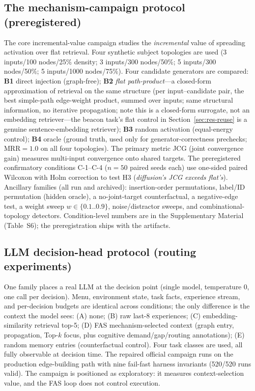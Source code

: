 \documentclass[10pt,a4paper]{article}
\begin{document}
\subsection{The mechanism-campaign protocol (preregistered)}
\label{sec:method-civ}
The core incremental-value campaign studies the \emph{incremental} value of spreading activation over flat retrieval. Four synthetic subject topologies are used (3 inputs/100 nodes/25\% density; 3 inputs/300 nodes/50\%; 5 inputs/300 nodes/50\%; 5 inputs/1000 nodes/75\%). Four candidate generators are compared: \textbf{B1} direct injection (graph-free); \textbf{B2} \emph{flat path-product}---a closed-form approximation of retrieval on the same structure (per input--candidate pair, the best simple-path edge-weight product, summed over inputs; same structural information, no iterative propagation; note this is a closed-form surrogate, not an embedding retriever---the beacon task's flat control in Section~\ref{sec:res-reuse} is a genuine sentence-embedding retriever); \textbf{B3} random activation (equal-energy control); \textbf{B4} oracle (ground truth, used only for generator-correctness prechecks; MRR${=}1.0$ on all four topologies). The primary metric JCG (joint convergence gain) measures multi-input convergence onto shared targets. The preregistered confirmatory conditions C-1--C-4 ($n{=}50$ paired seeds each) use one-sided paired Wilcoxon with Holm correction to test H3 (\emph{diffusion's JCG exceeds flat's}). Ancillary families (all run and archived): insertion-order permutations, label/ID permutation (hidden oracle), a no-joint-target counterfactual, a negative-edge test, a weight sweep $w\in\{0.1..0.9\}$, noise/distractor sweeps, and combinational-topology detectors. Condition-level numbers are in the Supplementary Material (Table~S6); the preregistration ships with the artifacts.

\subsection{LLM decision-head protocol (routing experiments)}
\label{sec:method-routing}
One family places a real LLM at the decision point (single model, temperature 0, one call per decision). Menu, environment state, task facts, experience stream, and per-decision budgets are identical across conditions; the only difference is the context the model sees: (A) none; (B) raw last-8 experiences; (C) embedding-similarity retrieval top-5; (D) FAS mechanism-selected context (graph entry, propagation, Top-$k$ focus, plus cognitive demand/gap/routing annotations); (E) random memory entries (counterfactual control). Four task classes are used, all fully observable at decision time. The repaired official campaign runs on the production edge-building path with nine fail-fast harness invariants (520/520 runs valid). The campaign is positioned as exploratory: it measures context-selection value, and the FAS loop does not control execution.
\end{document}
